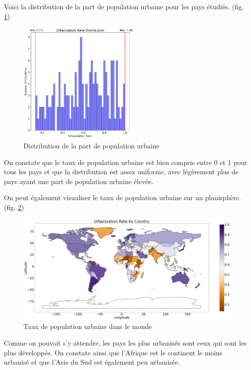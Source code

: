 \documentclass[12pt]{iEEEtran}
\begin{document}
Voici la distribution de la part de population urbaine pour les pays étudiés. (fig. \ref{fig:urb_rate})

\begin{figure}[h]
    \centering
    \includegraphics[width=6cm]{img/urb_rate.png}
    \caption{Distribution de la part de population urbaine}
    \label{fig:urb_rate}
\end{figure}

On constate que le taux de population urbaine est bien compris entre 0 et 1 pour tous les pays
et que la distribution est assez uniforme, avec légèrement plus de pays ayant une part de population
urbaine élevée.

On peut également visualiser le taux de population urbaine sur un planisphère. (fig. \ref{fig:urb_rate_world})

\begin{figure}[h]
    \centering
    \includegraphics[width=\columnwidth]{img/urb_rate_world.png}
    \caption{Taux de population urbaine dans le monde}
    \label{fig:urb_rate_world}
\end{figure}

Comme on pouvait s'y attendre, les pays les plus urbanisés sont ceux qui sont
les plus développés. On constate ainsi que l'Afrique est le continent le moins
urbanisé et que l'Asie du Sud est également peu urbanisée.
\end{document}
